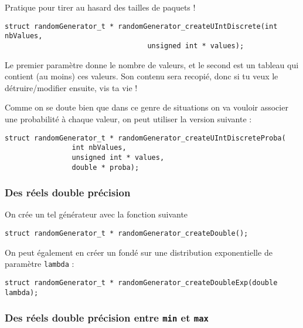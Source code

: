 \documentclass{article}
\begin{document}
   Pratique pour tirer au hasard des tailles de paquets !

\begin{verbatim}
struct randomGenerator_t * randomGenerator_createUIntDiscrete(int nbValues,
							      unsigned int * values);
\end{verbatim}

   Le premier paramètre donne le nombre de valeurs, et le second est
un tableau qui contient (au moins) ces valeurs. Son contenu sera
recopié, donc si tu veux le détruire/modifier ensuite, vis ta vie !

   Comme on se doute bien que dans ce genre de situations on va
vouloir associer une probabilité à chaque valeur, on peut utiliser la
version suivante :

\begin{verbatim}
struct randomGenerator_t * randomGenerator_createUIntDiscreteProba(
				int nbValues,
				unsigned int * values,
				double * proba);
\end{verbatim}

%
\subsubsection{Des réels double précision}

   On crée un tel générateur avec la fonction suivante

\begin{verbatim}
struct randomGenerator_t * randomGenerator_createDouble();
\end{verbatim}

   On peut également en créer un fondé sur une distribution
exponentielle de paramètre {\tt lambda} :

\begin{verbatim}
struct randomGenerator_t * randomGenerator_createDoubleExp(double lambda);
\end{verbatim}

%
\subsubsection{Des réels double précision entre {\tt min} et {\tt max}}
\end{document}

